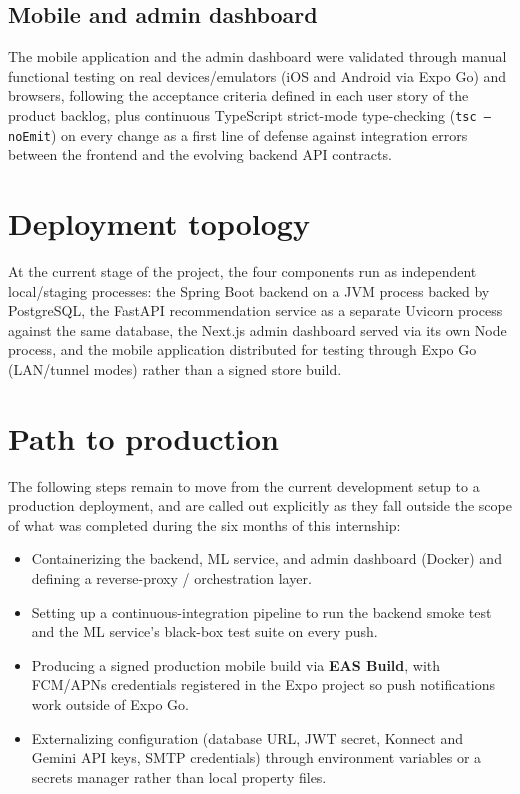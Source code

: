 \documentclass[a4paper,12pt]{report}
\begin{document}
\subsection{Mobile and admin dashboard}
The mobile application and the admin dashboard were validated through
manual functional testing on real devices/emulators (iOS and Android via
Expo Go) and browsers, following the acceptance criteria defined in each
user story of the product backlog, plus continuous TypeScript strict-mode
type-checking (\texttt{tsc --noEmit}) on every change as a first line of
defense against integration errors between the frontend and the evolving
backend API contracts.

\section{Deployment topology}
At the current stage of the project, the four components run as
independent local/staging processes: the Spring Boot backend on a JVM
process backed by PostgreSQL, the FastAPI recommendation service as a
separate Uvicorn process against the same database, the Next.js admin
dashboard served via its own Node process, and the mobile application
distributed for testing through Expo Go (LAN/tunnel modes) rather than a
signed store build.

\section{Path to production}
The following steps remain to move from the current development setup to
a production deployment, and are called out explicitly as they fall
outside the scope of what was completed during the six months of this
internship:
\begin{itemize}[leftmargin=*]
  \item Containerizing the backend, ML service, and admin dashboard
        (Docker) and defining a reverse-proxy / orchestration layer.
  \item Setting up a continuous-integration pipeline to run the backend
        smoke test and the ML service's black-box test suite on every
        push.
  \item Producing a signed production mobile build via \textbf{EAS
        Build}, with FCM/APNs credentials registered in the Expo project
        so push notifications work outside of Expo Go.
  \item Externalizing configuration (database URL, JWT secret, Konnect
        and Gemini API keys, SMTP credentials) through environment
        variables or a secrets manager rather than local property files.
\end{itemize}
\end{document}
